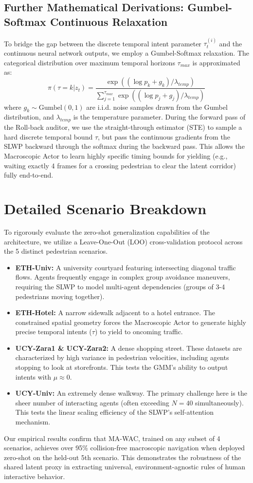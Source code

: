 \documentclass[conference]{IEEEtran}
\begin{document}
\subsection{Further Mathematical Derivations: Gumbel-Softmax Continuous Relaxation}
To bridge the gap between the discrete temporal intent parameter $\tau_t^{(i)}$ and the continuous neural network outputs, we employ a Gumbel-Softmax relaxation. The categorical distribution over maximum temporal horizons $\tau_{max}$ is approximated as:
\begin{equation}
\pi(\tau = k | z_t) = \frac{\exp((\log p_k + g_k) / \lambda_{temp})}{\sum_{j=1}^{\tau_{max}} \exp((\log p_j + g_j) / \lambda_{temp})}
\end{equation}
where $g_k \sim \text{Gumbel}(0,1)$ are i.i.d. noise samples drawn from the Gumbel distribution, and $\lambda_{temp}$ is the temperature parameter. During the forward pass of the Roll-back auditor, we use the straight-through estimator (STE) to sample a hard discrete temporal bound $\tau$, but pass the continuous gradients from the SLWP backward through the softmax during the backward pass. This allows the Macroscopic Actor to learn highly specific timing bounds for yielding (e.g., waiting exactly 4 frames for a crossing pedestrian to clear the latent corridor) fully end-to-end.

\section{Detailed Scenario Breakdown}
To rigorously evaluate the zero-shot generalization capabilities of the architecture, we utilize a Leave-One-Out (LOO) cross-validation protocol across the 5 distinct pedestrian scenarios.
\begin{itemize}
    \item \textbf{ETH-Univ:} A university courtyard featuring intersecting diagonal traffic flows. Agents frequently engage in complex group avoidance maneuvers, requiring the SLWP to model multi-agent dependencies (groups of 3-4 pedestrians moving together).
    \item \textbf{ETH-Hotel:} A narrow sidewalk adjacent to a hotel entrance. The constrained spatial geometry forces the Macroscopic Actor to generate highly precise temporal intents ($\tau$) to yield to oncoming traffic.
    \item \textbf{UCY-Zara1 \& UCY-Zara2:} A dense shopping street. These datasets are characterized by high variance in pedestrian velocities, including agents stopping to look at storefronts. This tests the GMM's ability to output intents with $\mu \approx 0$.
    \item \textbf{UCY-Univ:} An extremely dense walkway. The primary challenge here is the sheer number of interacting agents (often exceeding $N=40$ simultaneously). This tests the linear scaling efficiency of the SLWP's self-attention mechanism.
\end{itemize}
Our empirical results confirm that MA-WAC, trained on any subset of 4 scenarios, achieves over 95\% collision-free macroscopic navigation when deployed zero-shot on the held-out 5th scenario. This demonstrates the robustness of the shared latent proxy in extracting universal, environment-agnostic rules of human interactive behavior.
\end{document}
